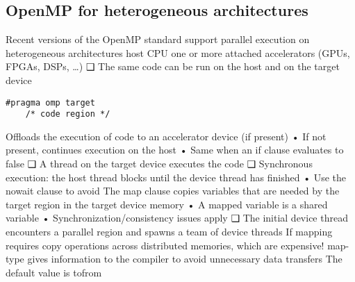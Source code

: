 \subsection{OpenMP for heterogeneous architectures}
Recent versions of the
OpenMP standard support
parallel execution on
heterogeneous
architectures
host CPU
one or more attached
accelerators (GPUs,
FPGAs, DSPs, …)
❑ The same code can be run
on the host and on the
target device
\begin{lstlisting}[style=C]
#pragma omp target
    /* code region */
\end{lstlisting}
Offloads the execution of code to an accelerator
device (if present)
• If not present, continues execution on the host
• Same when an if clause evaluates to false
❑ A thread on the target device executes the code
❑ Synchronous execution: the host thread blocks
until the device thread has finished
• Use the nowait clause to avoid
The map clause copies variables that are needed by
the target region in the target device memory
• A mapped variable is a shared variable
• Synchronization/consistency issues apply
❑ The initial device thread encounters a parallel
region and spawns a team of device threads
If mapping requires copy operations across
distributed memories, which are expensive!
map-type gives information to the compiler to
avoid unnecessary data transfers
The default value is tofrom